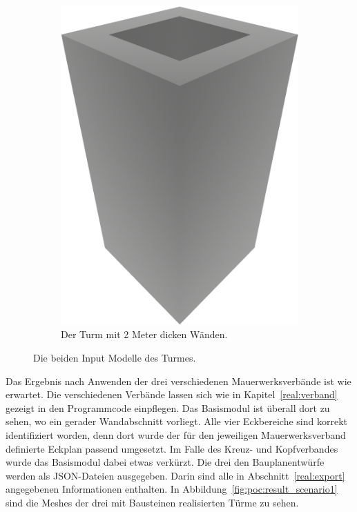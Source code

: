 \begin{figure}[ht!]
\begin{subfigure}[b]{0.3\columnwidth}
    \includegraphics[width=\columnwidth]{fig/render_base_thick.png}
    \caption{Der Turm mit 2 Meter dicken Wänden.}\label{fig:poc:render_laeuferverband50}
  \end{subfigure}
  \hspace*{\fill}%
  \caption{Die beiden Input Modelle des Turmes.}\label{fig:poc:scenario1 modell}
\end{figure}

Das Ergebnis nach Anwenden der drei verschiedenen Mauerwerksverbände ist wie erwartet.
Die verschiedenen Verbände lassen sich wie in Kapitel~\ref{real:verband} gezeigt in den Programmcode einpflegen.
Das Basismodul ist überall dort zu sehen, wo ein gerader Wandabschnitt vorliegt.
Alle vier Eckbereiche sind korrekt identifiziert worden, denn dort wurde der für den jeweiligen Mauerwerksverband definierte Eckplan passend umgesetzt.
Im Falle des Kreuz- und Kopfverbandes wurde das Basismodul dabei etwas verkürzt.
Die drei den Bauplanentwürfe werden als JSON-Dateien ausgegeben.
Darin sind alle in Abschnitt~\ref{real:export} angegebenen Informationen enthalten.
In Abbildung~\ref{fig:poc:result_scenario1} sind die Meshes der drei mit Bausteinen realisierten Türme zu sehen.

